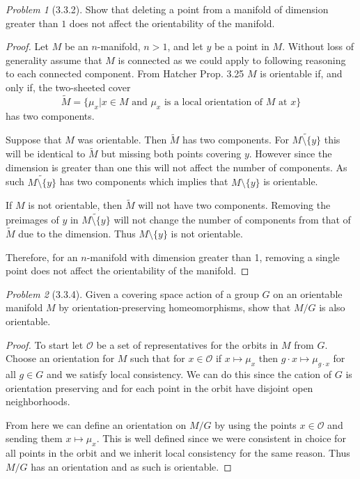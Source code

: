 \documentclass[10pt]{article}
\newcommand{\sk}{\vskip 10mm}
\newcommand{\wt}[1]{\widetilde{#1}}
\theoremstyle{remark}
\newtheorem{problem}{Problem}
\begin{document}
\begin{problem}[3.3.2]
  Show that deleting a point from a manifold of dimension greater than $1$
  does not affect the orientability of the manifold.
\end{problem}

\begin{proof}
  Let $M$ be an $n$-manifold, $n>1$, and let $y$ be a point in $M$. Without loss of
  generality assume that $M$ is connected as we could apply to following reasoning
  to each connected component. From Hatcher Prop. 3.25 $M$ is orientable if,
  and only if, the two-sheeted cover
  \[
    \wt{M}=\{\mu_x|\text{$x\in M$ and $\mu_x$ is a local orientation of $M$ at $x$}\}
  \]
  has two components.

  Suppose that $M$ was orientable. Then $\wt{M}$ has two components. For
  $\wt{M\setminus \{y\}}$ this will be identical to $\wt{M}$ but missing both points
  covering $y$. However since the dimension is greater than one this will
  not affect the number of components. As such $\wt{M\setminus \{y\}}$ has two components
  which implies that $M\setminus\{y\}$ is orientable.

  If $M$ is not orientable, then $\wt{M}$ will not have two components.
  Removing the preimages of $y$ in $\wt{M\setminus\{y\}}$ will not change the number
  of components from that of $\wt{M}$ due to the dimension. Thus $M\setminus \{y\}$
  is not orientable.

  Therefore, for an $n$-manifold with dimension greater than 1, removing a
  single point does not affect the orientability of the manifold.
\end{proof}

\sk

\begin{problem}[3.3.4]
  Given a covering space action of a group $G$ on an orientable manifold $M$
  by orientation-preserving homeomorphisms, show that $M/G$ is also orientable.
\end{problem}

\begin{proof}
  To start let $\mathcal{O}$ be a set of representatives for the
  orbits in $M$ from $G$. Choose an orientation for $M$ such that
  for $x\in \mathcal{O}$ if $x\mapsto\mu_x$ then $g\cdot x\mapsto \mu_{g\cdot x}$ for all $g\in G$
  and we satisfy local consistency. We can do this since the cation of $G$
  is orientation preserving and for each point in the orbit have disjoint
  open neighborhoods.

  From here we can define an orientation on $M/G$ by using the points
  $x\in\mathcal{O}$ and sending them $x\mapsto \mu_x$. This is well defined since
  we were consistent in choice for all points in the orbit and we inherit
  local consistency for the same reason. Thus $M/G$ has an orientation
  and as such is orientable.
\end{proof}
\end{document}
